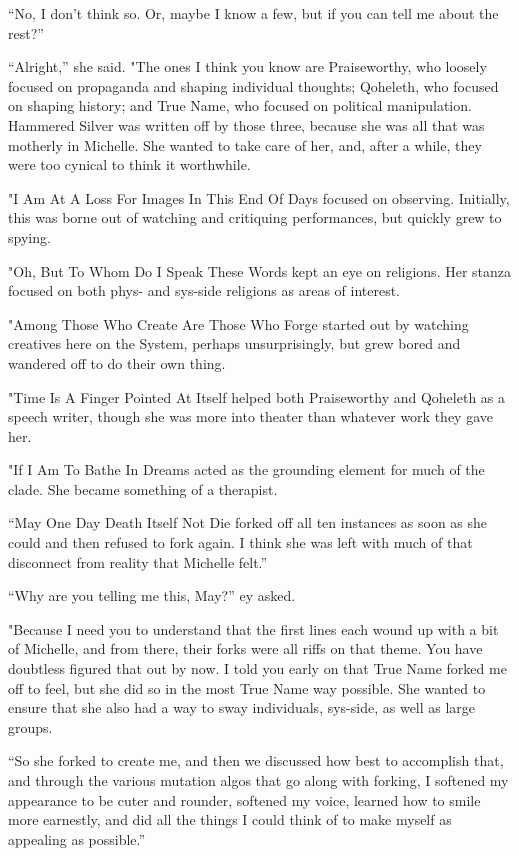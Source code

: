 ``No, I don't think so. Or, maybe I know a few, but if you can tell me about the rest?''

``Alright,'' she said. "The ones I think you know are Praiseworthy, who loosely focused on propaganda and shaping individual thoughts; Qoheleth, who focused on shaping history; and True Name, who focused on political manipulation. Hammered Silver was written off by those three, because she was all that was motherly in Michelle. She wanted to take care of her, and, after a while, they were too cynical to think it worthwhile.

"I Am At A Loss For Images In This End Of Days focused on observing. Initially, this was borne out of watching and critiquing performances, but quickly grew to spying.

"Oh, But To Whom Do I Speak These Words kept an eye on religions. Her stanza focused on both phys- and sys-side religions as areas of interest.

"Among Those Who Create Are Those Who Forge started out by watching creatives here on the System, perhaps unsurprisingly, but grew bored and wandered off to do their own thing.

"Time Is A Finger Pointed At Itself helped both Praiseworthy and Qoheleth as a speech writer, though she was more into theater than whatever work they gave her.

"If I Am To Bathe In Dreams acted as the grounding element for much of the clade. She became something of a therapist.

``May One Day Death Itself Not Die forked off all ten instances as soon as she could and then refused to fork again. I think she was left with much of that disconnect from reality that Michelle felt.''

``Why are you telling me this, May?'' ey asked.

"Because I need you to understand that the first lines each wound up with a bit of Michelle, and from there, their forks were all riffs on that theme. You have doubtless figured that out by now. I told you early on that True Name forked me off to feel, but she did so in the most True Name way possible. She wanted to ensure that she also had a way to sway individuals, sys-side, as well as large groups.

``So she forked to create me, and then we discussed how best to accomplish that, and through the various mutation algos that go along with forking, I softened my appearance to be cuter and rounder, softened my voice, learned how to smile more earnestly, and did all the things I could think of to make myself as appealing as possible.''

